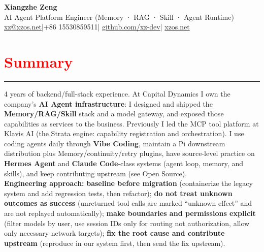 \documentclass[10pt,a4paper]{article}
\begin{document}
\begin{center}
	{\LARGE\textbf{Xiangzhe Zeng}}\\[4pt]
	{\large AI Agent Platform Engineer (Memory · RAG · Skill · Agent Runtime)}\\[5pt]
	\small
	\href{mailto:xz@xzos.net}{xz@xzos.net}\quad |\quad +86 15530859511\quad |\quad
	\href{https://github.com/xz-dev}{github.com/xz-dev}\quad |\quad
	\href{https://xzos.net}{xzos.net}
\end{center}

\section*{\textcolor{red}{Summary}}
\vspace*{-4ex}
\noindent\textcolor{red}{\rule{\linewidth}{0.4pt}}
4 years of backend/full-stack experience. At Capital Dynamics I own the company's \textbf{AI Agent infrastructure}: I designed and shipped the \textbf{Memory/RAG/Skill} stack and a model gateway, and exposed those capabilities as services to the business. Previously I led the MCP tool platform at Klavis AI (the Strata engine: capability registration and orchestration). I use coding agents daily through \textbf{Vibe Coding}, maintain a Pi downstream distribution plus Memory/continuity/retry plugins, have source-level practice on \textbf{Hermes Agent} and \textbf{Claude Code}-class systems (agent loop, memory, and skills), and keep contributing upstream (see Open Source).\\
\textbf{Engineering approach:} \textbf{baseline before migration} (containerize the legacy system and add regression tests, then refactor); \textbf{do not treat unknown outcomes as success} (unreturned tool calls are marked ``unknown effect'' and are not replayed automatically); \textbf{make boundaries and permissions explicit} (filter models by user, use session IDs only for routing not authorization, allow only necessary network targets); \textbf{fix the root cause and contribute upstream} (reproduce in our system first, then send the fix upstream).
\end{document}
